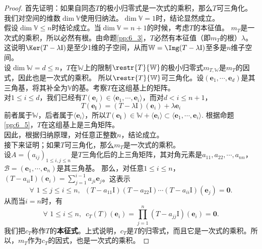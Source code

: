 \documentclass[12pt,UTF8]{ctexbook}
\begin{document}
\begin{proof} %
    首先证明：如果自同态$T$的极小归零式是一次式的乘积，那么$T$可三角化。\\
    我们对空间的维数$\dim \mathbb{V}$使用归纳法。$\dim \mathbb{V} = 1$时，结论显然成立。\\
    假设$\dim \mathbb{V} \leqslant n$时结论成立。当$\dim \mathbb{V} = n+1$的时候，考虑$T$的本征值。
    $m_T$是一次式的乘积，所以必然有根。由命题\ref{pp:6_3}，$T$必然有本征值（即$m_T$的根）$\lambda$。
    这说明$\Ker (T - \lambda\mathrm{I})$是至少1维的子空间，从而$\mathbb{W} = \Img (T - \lambda\mathrm{I})$至多是$n$维子空间。\\
    设$\dim \mathbb{W} = d \leqslant n$，$T$在$\mathbb{W}$上的限制$\restr{T}{\mathbb{W}}$的极小归零式$m_{T,\mathbb{W}}$是$m_T$的因式，因此也是一次式的乘积。
    所以$\restr{T}{\mathbb{W}}$可三角化。设$(\mathbf{e}_1, \cdots, \mathbf{e}_d)$是其三角基，将其补全为$\mathbb{V}$的基。考察$T$在这组基上的矩阵。\\
    对$1 \leqslant i \leqslant d$，我们已经有$T(\mathbf{e}_i) \in \langle \mathbf{e}_1, \cdots, \mathbf{e}_i\rangle$，而对$d < i \leqslant n+1$，
    $$T(\mathbf{e_i}) = (T - \lambda\mathrm{I})(\mathbf{e}_i) + \lambda \mathbf{e}_i$$
    前者属于$\mathbb{W}$，后者属于$\langle \mathbf{e}_i\rangle$，所以$T(\mathbf{e_i}) \in \mathbb{W}+\langle \mathbf{e}_i\rangle \subset  \langle \mathbf{e}_1, \cdots, \mathbf{e}_i\rangle.$
    根据命题\ref{pp:6_5}，$T$在这组基上是三角矩阵。\\
    因此，根据归纳原理，对任意正整数$n$，结论成立。\\
    接下来证明；如果$T$可三角化，那么$m_T$是一次式的乘积。\\
    设$A = (a_{ij})_{1\leqslant i, j\leqslant n}$是$T$三角化后的上三角矩阵，其对角元素是$a_{11}, a_{22}, \cdots, a_{nn}$，
    $\mathcal{B} = (\mathbf{e}_1, \cdots, \mathbf{e}_n)$是其三角基。
    那么，对任意$1\leqslant i \leqslant n$，$(T - a_{ii}\mathrm{I})(\mathbf{e}_i) = \sum_{j=1}^{i-1}a_{ji}\mathbf{e}_j$。这表示
    $$ \forall \,\,1\leqslant j \leqslant i \leqslant n, \,\,\, (T - a_{11}\mathrm{I})(T - a_{22}\mathrm{I})\cdots(T - a_{ii}\mathrm{I})(\mathbf{e}_j) = \mathbf{0}. $$
    从而当$i=n$时，有
    $$\forall \,\,1\leqslant i \leqslant n, \,\,\, c_T(T)(\mathbf{e}_i) = \prod_{j=1}^n(T - a_{jj}\mathrm{I})(\mathbf{e}_i) = \mathbf{0}.$$
    我们把$c_T$称作$T$的\textbf{本征式}。上式说明，$c_T$是$T$的归零式，而且它是一次式的乘积。所以，$m_T$作为$c_T$的因式，也是一次式的乘积。 

\end{proof}
\end{document}
